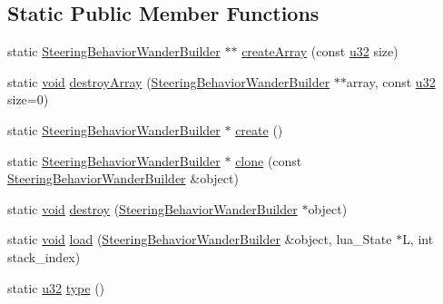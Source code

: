 \subsection*{Static Public Member Functions}
\begin{DoxyCompactItemize}
\item 
static \mbox{\hyperlink{classnjli_1_1_steering_behavior_wander_builder}{Steering\+Behavior\+Wander\+Builder}} $\ast$$\ast$ \mbox{\hyperlink{classnjli_1_1_steering_behavior_wander_builder_ab1bed63bdaff471963e8a73365ff031b}{create\+Array}} (const \mbox{\hyperlink{_util_8h_a10e94b422ef0c20dcdec20d31a1f5049}{u32}} size)
\item 
static \mbox{\hyperlink{_thread_8h_af1e856da2e658414cb2456cb6f7ebc66}{void}} \mbox{\hyperlink{classnjli_1_1_steering_behavior_wander_builder_af5a2a240a478b5ea5f5a27e73fc27004}{destroy\+Array}} (\mbox{\hyperlink{classnjli_1_1_steering_behavior_wander_builder}{Steering\+Behavior\+Wander\+Builder}} $\ast$$\ast$array, const \mbox{\hyperlink{_util_8h_a10e94b422ef0c20dcdec20d31a1f5049}{u32}} size=0)
\item 
static \mbox{\hyperlink{classnjli_1_1_steering_behavior_wander_builder}{Steering\+Behavior\+Wander\+Builder}} $\ast$ \mbox{\hyperlink{classnjli_1_1_steering_behavior_wander_builder_ace6ff70bccb471890aff7eb404e91c73}{create}} ()
\item 
static \mbox{\hyperlink{classnjli_1_1_steering_behavior_wander_builder}{Steering\+Behavior\+Wander\+Builder}} $\ast$ \mbox{\hyperlink{classnjli_1_1_steering_behavior_wander_builder_a3cbf7454690383954fdeefb6a05a563e}{clone}} (const \mbox{\hyperlink{classnjli_1_1_steering_behavior_wander_builder}{Steering\+Behavior\+Wander\+Builder}} \&object)
\item 
static \mbox{\hyperlink{_thread_8h_af1e856da2e658414cb2456cb6f7ebc66}{void}} \mbox{\hyperlink{classnjli_1_1_steering_behavior_wander_builder_a0392fb6f7aa53083408c6ece75b00c60}{destroy}} (\mbox{\hyperlink{classnjli_1_1_steering_behavior_wander_builder}{Steering\+Behavior\+Wander\+Builder}} $\ast$object)
\item 
static \mbox{\hyperlink{_thread_8h_af1e856da2e658414cb2456cb6f7ebc66}{void}} \mbox{\hyperlink{classnjli_1_1_steering_behavior_wander_builder_ac6ed8b850486ea0d0ee71afb3bbf29ec}{load}} (\mbox{\hyperlink{classnjli_1_1_steering_behavior_wander_builder}{Steering\+Behavior\+Wander\+Builder}} \&object, lua\+\_\+\+State $\ast$L, int stack\+\_\+index)
\item 
static \mbox{\hyperlink{_util_8h_a10e94b422ef0c20dcdec20d31a1f5049}{u32}} \mbox{\hyperlink{classnjli_1_1_steering_behavior_wander_builder_ad033c4651eb9c3a2969a73b4970e139e}{type}} ()
\end{DoxyCompactItemize}
